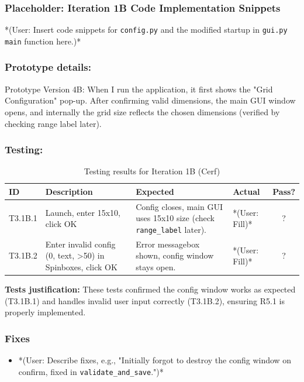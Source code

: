 \newpage
\subsubsection*{Placeholder: Iteration 1B Code Implementation Snippets}
*(User: Insert code snippets for \verb|config.py| and the modified startup in \verb|gui.py| \verb|main| function here.)*
\newpage

\subsubsection{Prototype details:}
Prototype Version 4B: When I run the application, it first shows the "Grid Configuration" pop-up. After confirming valid dimensions, the main GUI window opens, and internally the grid size reflects the chosen dimensions (verified by checking range label later).

\subsubsection{Testing:}
\begin{table}[htbp]
	\centering
	\begin{tabularx}{\textwidth}{|l|X|p{4.5cm}|p{1.5cm}|c|}
		\hline
		\textbf{ID} & \textbf{Description} & \textbf{Expected} & \textbf{Actual} & \textbf{Pass?} \\
		\hline
		T3.1B.1 & Launch, enter 15x10, click OK & Config closes, main GUI uses 15x10 size (check \verb|range_label| later). & *(User: Fill)* & ? \\
		\hline
		T3.1B.2 & Enter invalid config (0, text, >50) in Spinboxes, click OK & Error messagebox shown, config window stays open. & *(User: Fill)* & ? \\
		\hline
	\end{tabularx}
	\caption{Testing results for Iteration 1B (Cerf)}
\end{table}
\textbf{Tests justification:} These tests confirmed the config window works as expected (T3.1B.1) and handles invalid user input correctly (T3.1B.2), ensuring R5.1 is properly implemented.

\subsubsection{Fixes}
\begin{itemize}
	\item *(User: Describe fixes, e.g., "Initially forgot to destroy the config window on confirm, fixed in \verb|validate_and_save|.")*
\end{itemize}

